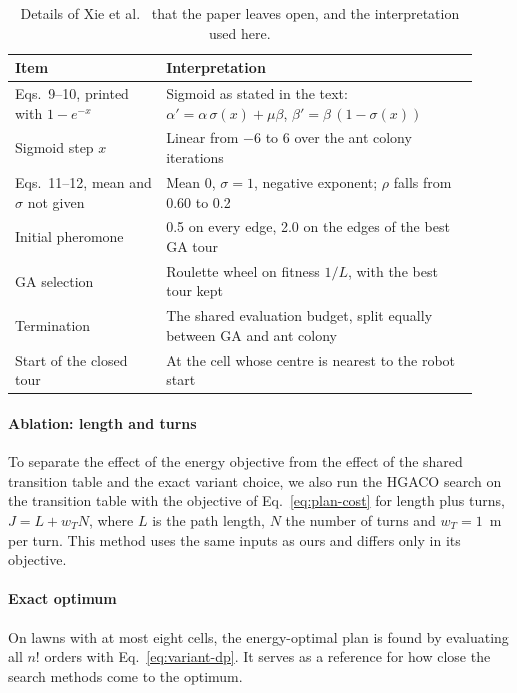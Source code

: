 \begin{table}[t]
\centering
\caption{Details of Xie et al.\ \cite{xieHybridGeneticAnt2024} that the paper leaves open, and the interpretation used here.}
\label{tab:xie-interpretation}
\small
\begin{tabular}{p{0.3\linewidth} p{0.62\linewidth}}
\toprule
Item & Interpretation \\
\midrule
Eqs.~9--10, printed with $1 - e^{-x}$ & Sigmoid as stated in the text: $\alpha' = \alpha\,\sigma(x) + \mu\beta$, $\beta' = \beta\,(1 - \sigma(x))$ \\
Sigmoid step $x$ & Linear from $-6$ to $6$ over the ant colony iterations \\
Eqs.~11--12, mean and $\sigma$ not given & Mean 0, $\sigma = 1$, negative exponent; $\rho$ falls from 0.60 to 0.2 \\
Initial pheromone & 0.5 on every edge, 2.0 on the edges of the best GA tour \\
GA selection & Roulette wheel on fitness $1/L$, with the best tour kept \\
Termination & The shared evaluation budget, split equally between GA and ant colony \\
Start of the closed tour & At the cell whose centre is nearest to the robot start \\
\bottomrule
\end{tabular}
\end{table}

\paragraph{Ablation: length and turns}
To separate the effect of the energy objective from the effect of the shared transition table and the exact variant choice, we also run the HGACO search on the transition table with the objective of Eq.~\eqref{eq:plan-cost} for length plus turns, $J = L + w_T N$, where $L$ is the path length, $N$ the number of turns and $w_T = 1$~m per turn.
This method uses the same inputs as ours and differs only in its objective.

\paragraph{Exact optimum}
On lawns with at most eight cells, the energy-optimal plan is found by evaluating all $n!$ orders with Eq.~\eqref{eq:variant-dp}.
It serves as a reference for how close the search methods come to the optimum.

